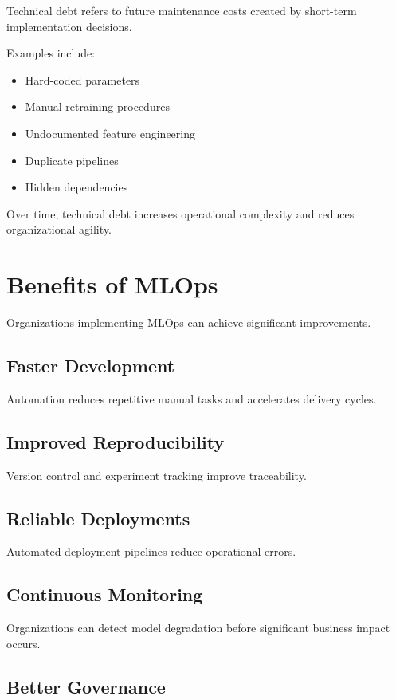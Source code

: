 Technical debt refers to future maintenance costs created by short-term implementation decisions.

Examples include:

\begin{itemize}
    \item Hard-coded parameters
    \item Manual retraining procedures
    \item Undocumented feature engineering
    \item Duplicate pipelines
    \item Hidden dependencies
\end{itemize}

Over time, technical debt increases operational complexity and reduces organizational agility.

\section{Benefits of MLOps}

Organizations implementing MLOps can achieve significant improvements.

\subsection{Faster Development}

Automation reduces repetitive manual tasks and accelerates delivery cycles.

\subsection{Improved Reproducibility}

Version control and experiment tracking improve traceability.

\subsection{Reliable Deployments}

Automated deployment pipelines reduce operational errors.

\subsection{Continuous Monitoring}

Organizations can detect model degradation before significant business impact occurs.

\subsection{Better Governance}

